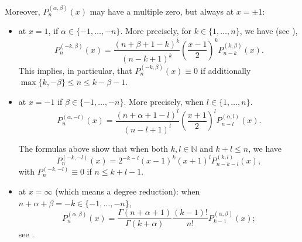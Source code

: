 \documentclass[reqno,11pt]{amsart}
\theoremstyle{remark}
\newcommand{\raising}[2]{\left(#1\right)^{\overline{#2}}}
\begin{document}
Moreover, $P_n^{(\alpha, \beta)}(x)$ may have a multiple zero, but always at $x=\pm1$:
\begin{itemize}
    \item at $x=1$, if $\alpha \in\{-1, \ldots,-n\}$. More precisely, for $k \in\{1, \ldots, n\}$, we have (see \cite[Eq. (4.22.2)]{szego1975orthogonal}),
\begin{equation}
    \label{reductionJacobi1}
    P_n^{(-k, \beta)}(x)=\frac{\raising{n+\beta+1-k}{k} }{\raising{n-k+1}{k}} \left(\frac{x-1}{2}\right)^k P_{n-k}^{(k, \beta)}(x).
\end{equation}
This implies, in particular, that $P_n^{(-k, \beta)}(x) \equiv 0$ if additionally $\max \{k,-\beta\} \leq n \leq k-\beta-1$. 

    \item at $x=-1$ if $\beta \in\{-1, \ldots,-n\}$. More precisely, when $l \in\{1, \ldots, n\}$. 
    \begin{equation}
    \label{reductionJacobi1bis}
    P_n^{(\alpha, -l)}(x)=  \frac{\raising{n+\alpha+1-l}{l} }{\raising{n-l+1}{l}} \left(\frac{x+1}{2}\right)^l P_{n-l}^{(\alpha, l)}(x).
\end{equation}
    
The formulas above show that when both $k, l \in \mathbb{N}$ and $k+l \leq n$, we have
   \begin{equation}
   \label{reductionJacobi3new}
P_n^{(-k,-l)}(x)=2^{-k-l}(x-1)^k(x+1)^l P_{n-k-l}^{(k, l)}(x),
\end{equation}
with $P_n^{(-k,-l)}\equiv 0$ if $n\le k+l-1$. \\

    \item at $x=\infty$ (which means a degree reduction):  when $n+\alpha+\beta=-k \in\{-1, \ldots,-n\}$,
 \begin{equation*}
P_n^{(\alpha, \beta)}(x)=\frac{\Gamma(n+\alpha+1)}{\Gamma(k+\alpha)} \frac{(k-1) !}{n !} P_{k-1}^{(\alpha, \beta)}(x) ;
\end{equation*}
see \cite[Eq. (4.22.3)]{szego1975orthogonal}.  
\end{itemize}
\end{document}
